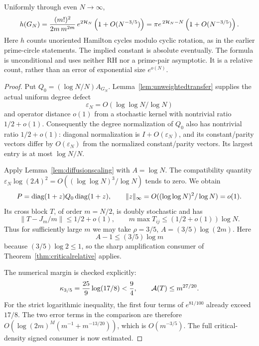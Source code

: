 \begin{theorem}
\label{thm:relativeprimecircles}
Uniformly through even \(N\to\infty\),
\[
 h(G_N)=
 \frac{(m!)^2}{2m\,m^{2m}}\,e^{2{\cal H}_N}
                  \left(1+O(N^{-3/5})\right)
       =\pi e^{\,2{\cal H}_N-N}
                  \left(1+O(N^{-3/5})\right).
\]
Here \(h\) counts unoriented Hamilton cycles modulo cyclic
rotation, as in the earlier prime-circle statements.
The implied constant is absolute eventually.
The formula is unconditional and uses neither RH nor a
prime-pair asymptotic. It is a relative count, rather than
an error of exponential size \(e^{o(N)}\).
\end{theorem}
\begin{proof}
Put \(Q_0=(\log N/N)A_{G_N}\).
Lemma~\ref{lem:unweightedtransfer} supplies the actual
uniform degree defect
\[
 \varepsilon_N=O(\log\log N/\log N)
\]
and operator distance \(o(1)\) from a stochastic kernel
with nontrivial ratio \(1/2+o(1)\).
Consequently the degree normalization of \(Q_0\) also
has nontrivial ratio \(1/2+o(1)\): diagonal normalization
is \(I+O(\varepsilon_N)\), and its constant/parity
vectors differ by \(O(\varepsilon_N)\) from the
normalized constant/parity vectors.
Its largest entry is at most \(\log N/N\).

Apply Lemma~\ref{lem:diffusionscaling} with \(A=\log N\).
The compatibility quantity
\(\varepsilon_N\log(2A)^2=O((\log\log N)^3/\log N)\)
tends to zero. We obtain
\[
 P=\operatorname{diag}(1+z)Q_0\operatorname{diag}(1+z),\qquad
 \|z\|_\infty=O((\log\log N)^2/\log N)=o(1).
\]
Its cross block \(T\), of order \(m=N/2\), is doubly
stochastic and has
\[
 \|T-J_m/m\|\leq1/2+o(1),\qquad
 m\max T_{ij}\leq(1/2+o(1))\log N.
\]
Thus for sufficiently large \(m\) we may take
\(\rho=3/5\), \(A=(3/5)\log(2m)\).
Here
\[
 A-1\leq(3/5)\log m
\]
because \((3/5)\log2\leq1\), so the sharp amplification
consumer of Theorem~\ref{thm:criticalrelative} applies.

The numerical margin is checked explicitly:
\[
 \kappa_{3/5}=\frac{25}{9}\log(17/8)<\frac94,\qquad
 {\cal A}(T)\leq m^{27/20}.
\]
For the strict logarithmic inequality, the first four
terms of \(e^{81/100}\) already exceed \(17/8\).
The two error terms in the comparison are therefore
\(O(\log(2m)^M(m^{-1}+m^{-13/20}))\),
which is \(O(m^{-3/5})\).
The full critical-density signed consumer is now estimated.


\end{proof}
